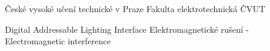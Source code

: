 

  {České vysoké učení technické v Praze}
   {Fakulta elektrotechnická ČVUT}

  {Digital Addressable Lighting Interface}
  {Elektromagnetické rušení - Electromagnetic interference}


